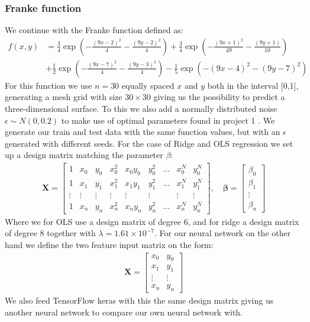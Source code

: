 \documentclass[11pt]{article}
\begin{document}
\subsubsection*{Franke function}
We continue with the Franke function defined as:
\begin{align*}
    f(x,y) & = \frac{3}{4 }\exp\left(- \frac{(9x -2 )^2}{4} - \frac{(9y-2)^2}{4}\right) +\frac{3}{4}\exp{\left(-\frac{(9x+1)^2}{49}- \frac{(9y+1)}{10}\right)} \\
           & +\frac{1}{2}\exp{\left(-\frac{(9x-7)^2}{4} - \frac{(9y-3)^2}{4}\right)} -\frac{1}{5}\exp{\left( -(9x-4)^2 - (9y-7)^2\right) }
\end{align*}
For this function we use $n=30$ equally spaced $x$ and $y$ both in the interval [0,1], generating a mesh grid with size $30 \times 30$ giving us the possibility to predict a three-dimensional surface. To this we also add a normally distributed noise $\epsilon\sim N(0, 0.2)$ to make use of optimal parameters found in project 1 \cite{project1}. We generate our train and test data with the same function values, but with an $\epsilon$ generated with different seeds. For the case of Ridge and OLS regression we set up a design matrix matching the parameter $\beta$:
\begin{align*}
    \boldsymbol{X} = \begin{bmatrix}
        1      & x_0    & y_0    & x_0^2  & x_0y_0 & y_0^2  & \hdots & x_0^N  & y_0^N  \\
        1      & x_1    & y_1    & x_1^2  & x_1y_1 & y_1^2  & \hdots & x_1^N  & y_1^N  \\
        \vdots & \vdots & \vdots & \vdots & \vdots & \vdots &        & \vdots & \vdots \\
        1      & x_n    & y_n    & x_n^2  & x_ny_n & y_n^2  & \hdots & x_n^N  & y_n^N
    \end{bmatrix}
    , \quad
    \boldsymbol{\beta} =
    \begin{bmatrix}
        \beta_0 \\
        \beta_1 \\
        \vdots  \\
        \beta_n
    \end{bmatrix}
\end{align*}
Where we for OLS use a design matrix of degree 6, and for ridge a design matrix of degree 8 together with $\lambda = 1.61 \times10^{-7}$.
For our neural network on the other hand we define the two feature input matrix on the form:
\begin{align*}
    \boldsymbol{X} =
    \begin{bmatrix}
        x_0      & y_0    \\
        x_1      & y_1    \\
        \vdots\  & \vdots \\
        x_n      & y_n
    \end{bmatrix}
\end{align*}
We also feed TensorFlow keras with this the same design matrix giving us another neural network to compare our own neural network with.
\end{document}

